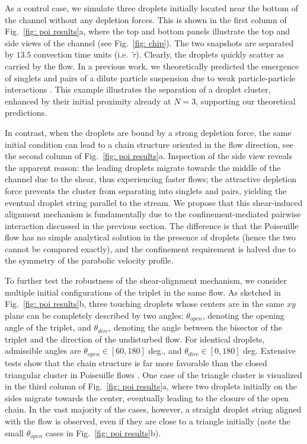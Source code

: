 As a control case, we simulate three droplets initially located near the bottom of the channel without any depletion forces. This is shown in the first column of Fig.\ \ref{fig: poi results}a, where the top and bottom panels illustrate the top and side views of the channel (see Fig.\ \ref{fig: chip}). The two snapshots are separated by $13.5$ convection time units (i.e.\ $\tilde{\tau}$). Clearly, the droplets quickly scatter as carried by the flow. In a previous work, we theoretically predicted the emergence of singlets and pairs of a dilute particle suspension due to weak particle-particle interactions \cite{Fouxon_2017}. This example illustrates the separation of a droplet cluster, enhanced by their initial proximity already at $N=3$, supporting our theoretical predictions.

In contrast, when the droplets are bound by a strong depletion force, the same initial condition can lead to a chain structure oriented in the flow direction, see the second column of Fig.\ \ref{fig: poi results}a. Inspection of the side view reveals the apparent reason: the leading droplets migrate towards the middle of the channel due to the shear, thus experiencing faster flows; the attractive depletion force prevents the cluster from separating into singlets and pairs, yielding the eventual droplet string parallel to the stream. We propose that this shear-induced alignment mechanism is fundamentally due to the confinement-mediated pairwise interaction discussed in the previous section. The difference is that the Poiseuille flow has no simple analytical solution in the presence of droplets (hence the two cannot be compared exactly), and the confinement requirement is halved due to the symmetry of the parabolic velocity profile.

To further test the robustness of the shear-alignment mechanism, we consider multiple initial configurations of the triplet in the same flow. As sketched in Fig.\ \ref{fig: poi results}b, three touching droplets whose centers are in the same $xy$ plane can be completely described by two angles: $\theta_{open}$, denoting the opening angle of the triplet, and $\theta_{dirc}$, denoting the angle between the bisector of the triplet and the direction of the undisturbed flow. For identical droplets, admissible angles are $\theta_{open} \in [60, 180]$ deg., and $\theta_{dirc} \in [0,180]$ deg. Extensive tests show that the chain structure is far more favorable than the closed triangular cluster in Poiseuille flows . One case of the triangle cluster is visualized in the third column of Fig.\ \ref{fig: poi results}a, where two droplets initially on the sides migrate towards the center, eventually leading to the closure of the open chain. In the vast majority of the cases, however, a straight droplet string aligned with the flow is observed, even if they are close to a triangle initially (note the small $\theta_{open}$ cases in Fig.\ \ref{fig: poi results}b).

